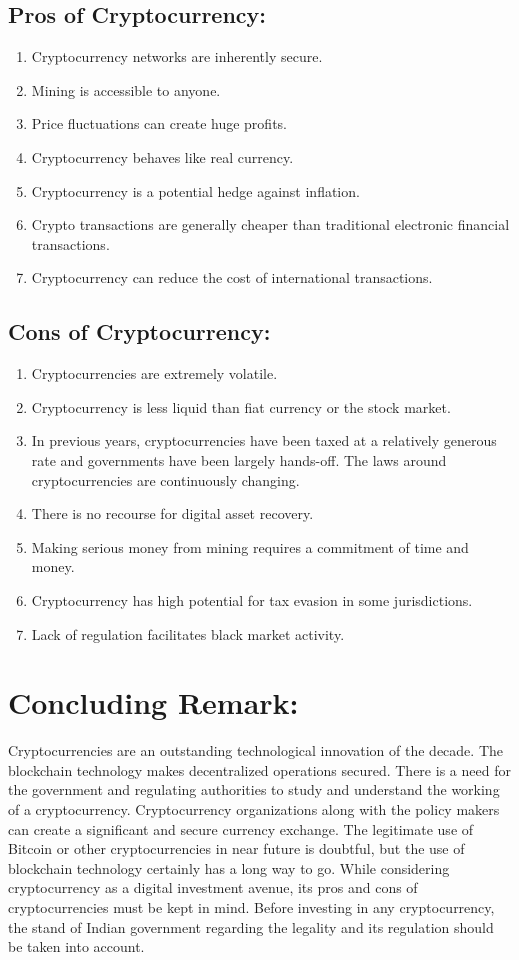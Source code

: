 \documentclass[11pt]{article}
\begin{document}
\subsection*{Pros of Cryptocurrency:}
\begin{enumerate}
    \item Cryptocurrency networks are inherently secure.
    \item Mining is accessible to anyone.
    \item Price fluctuations can create huge profits.
    \item Cryptocurrency behaves like real currency.
    \item Cryptocurrency is a potential hedge against inflation.
    \item Crypto transactions are generally cheaper than traditional electronic financial transactions.
    \item Cryptocurrency can reduce the cost of international transactions.
\end{enumerate}

\subsection*{Cons of Cryptocurrency:}
\begin{enumerate}
    \item Cryptocurrencies are extremely volatile.
    \item Cryptocurrency is less liquid than fiat currency or the stock market.
    \item In previous years, cryptocurrencies have been taxed at a relatively generous rate and governments have been largely hands-off. The laws around cryptocurrencies are continuously changing.
    \item There is no recourse for digital asset recovery.
    \item Making serious money from mining requires a commitment of time and money.
    \item Cryptocurrency has high potential for tax evasion in some jurisdictions.
    \item Lack of regulation facilitates black market activity.
\end{enumerate}

\section*{Concluding Remark:}
Cryptocurrencies are an outstanding technological innovation of the decade. The blockchain technology makes decentralized operations secured. There is a need for the government and regulating authorities to study and understand the working of a cryptocurrency. Cryptocurrency organizations along with the policy makers can create a significant and secure currency exchange. The legitimate use of Bitcoin or other cryptocurrencies in near future is doubtful, but the use of blockchain technology certainly has a long way to go. While considering cryptocurrency as a digital investment avenue, its pros and cons of cryptocurrencies must be kept in mind. Before investing in any cryptocurrency, the stand of Indian government regarding the legality and its regulation should be taken into account.
\end{document}
